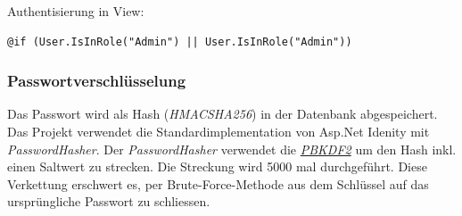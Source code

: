 			Authentisierung in View:
			\begin{lstlisting}[language=CSharp, caption=\_Layout.cshtml, label=lst:layoutauthentisierung, firstnumber=1]
@if (User.IsInRole("Admin") || User.IsInRole("Admin"))
			\end{lstlisting}

		\subsubsection{Passwortverschlüsselung}
		Das Passwort wird als Hash (\textit{HMACSHA256}) in der Datenbank abgespeichert. Das Projekt verwendet die Standardimplementation von Asp.Net Idenity mit \textit{PasswordHasher}. Der \textit{PasswordHasher} verwendet die \href{http://de.wikipedia.org/wiki/PBKDF2}{\textit{PBKDF2}} um den Hash inkl. einen Saltwert zu strecken. Die Streckung wird 5000 mal durchgeführt. Diese Verkettung erschwert es, per Brute-Force-Methode aus dem Schlüssel auf das ursprüngliche Passwort zu schliessen.